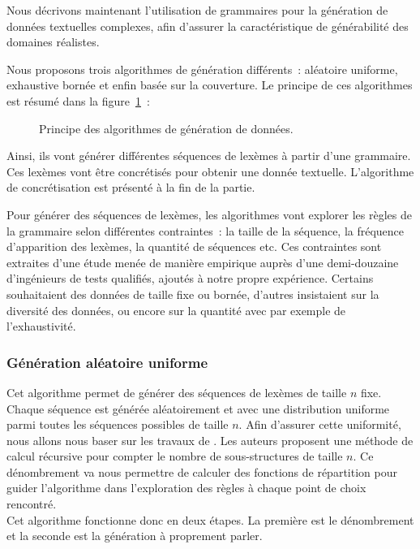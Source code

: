 Nous décrivons maintenant l'utilisation de grammaires pour la génération de
données textuelles complexes, afin d'assurer la caractéristique de générabilité
des domaines réalistes.

Nous proposons trois algorithmes de génération différents~: aléatoire uniforme,
exhaustive bornée et enfin basée sur la couverture. Le principe de ces
algorithmes est résumé dans la figure~\ref{figure:data:grammar}~:
%
\begin{figure}


\caption{\label{figure:data:grammar} Principe des algorithmes de génération de
données.}

\end{figure}
%
Ainsi, ils vont générer différentes séquences de lexèmes à partir d'une
grammaire. Ces lexèmes vont être concrétisés pour obtenir une donnée
textuelle. L'algorithme de concrétisation est présenté à la fin de la partie.

Pour générer des séquences de lexèmes, les algorithmes vont explorer les règles
de la grammaire selon différentes contraintes~: la taille de la séquence, la
fréquence d'apparition des lexèmes, la quantité de séquences etc. Ces
contraintes sont extraites d'une étude menée de manière empirique auprès d'une
demi-douzaine d'ingénieurs de tests qualifiés, ajoutés à notre propre
expérience. Certains souhaitaient des données de taille fixe ou bornée,
d'autres insistaient sur la diversité des données, ou encore sur la quantité
avec par exemple de l'exhaustivité.

\subsubsection{Génération aléatoire uniforme}
\label{subsection:data:random_uniform_generation}

Cet algorithme permet de générer des séquences de lexèmes de taille $n$ fixe.
Chaque séquence est générée aléatoirement et avec une distribution uniforme
parmi toutes les séquences possibles de taille $n$. Afin d'assurer cette
uniformité, nous allons nous baser sur les travaux de . Les
auteurs proposent une méthode de calcul récursive pour compter le nombre de
sous-structures de taille $n$. Ce dénombrement va nous permettre de calculer des
fonctions de répartition pour guider l'algorithme dans l'exploration des règles
à chaque point de choix rencontré. \\
Cet algorithme fonctionne donc en deux étapes. La première est le dénombrement
et la seconde est la génération à proprement parler.

